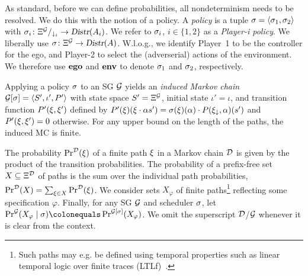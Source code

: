 {{%
As standard, before we can define probabilities, all nondeterminism needs to be resolved. We do this with the notion of a policy. A \emph{policy} is a tuple $\sched = \langle \sched_1, \sched_2 \rangle$ with $\sched_i \colon \PiPaths[]{\sg} \rightarrow \Distr(\Act_i)$. We refer to $\sched_i$, $i \in \{ 1, 2 \}$ as a \emph{Player-i policy}. We liberally use $\sched \colon \Paths{\sg} \rightarrow \Distr(\Act)$.
W.l.o.g., we identify Player~1 to be the controller for the ego, and Player-2 to select the (adverserial) actions of the environment.  
We therefore use $\pOneSched$ and $\pTwoSched$ to denote $\sched_1$ and $\sched_2$, respectively. 

Applying a policy $\sched$ to an SG $\sg$ yields an \emph{induced Markov chain} $\induced{\sg}{\sched} = \langle S', \iota', P' \rangle$ with state space $S' = \Paths{\sg}$, initial state $\iota' = \iota$, and transition function $P'(\path,\path')$ defined by $P'(\path)(\path \cdot \act s') = \sched(\path)(\act) \cdot P(\last{\path},\act)(s')$ and $P'(\path,\path') = 0$ otherwise. For any upper bound on the length of the paths, the induced MC is finite. 


\begin{example}
	
\end{example}


The probability $\Pr^\mc(\path)$ of a finite path $\path$ in a Markov chain $\mc$ is given by the product of the transition probabilities.
The probability of a prefix-free set $X \subseteq \Paths{\mc}$  of paths is the sum over the individual path probabilities, $\Pr^\mc(X) = \sum_{\path \in X} \Pr^\mc(\path)$.
We consider sets $X_\varphi$ of finite paths\footnote{Such paths may e.g. be defined using temporal properties such as linear temporal logic over finite traces (LTLf)~\cite{}.} reflecting some specification $\varphi$.   
Finally, for any SG $\sg$ and scheduler $\sched$, let $\Pr^\sg(X_\varphi \mid  \sched) \colonequals \Pr^{\induced{\sg}{\sched}}(X_\varphi)$.  
We omit the superscript $\mc$/$\sg$ whenever it is clear from the context.

\begin{example}
	

\end{example}}}
